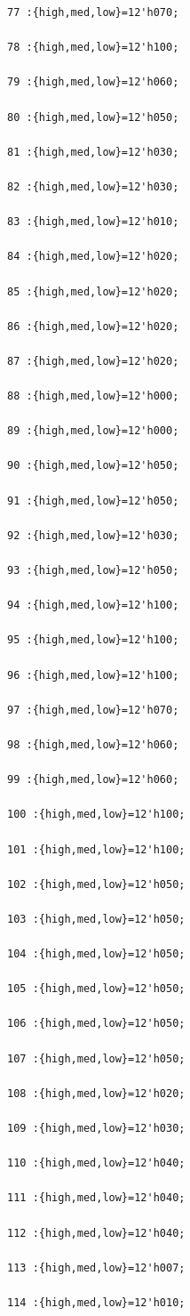 \documentclass[UTF8]{ctexart}
\begin{document}
\begin{verbatim}
77 :{high,med,low}=12'h070;

78 :{high,med,low}=12'h100;

79 :{high,med,low}=12'h060;

80 :{high,med,low}=12'h050;

81 :{high,med,low}=12'h030;

82 :{high,med,low}=12'h030;

83 :{high,med,low}=12'h010;

84 :{high,med,low}=12'h020;

85 :{high,med,low}=12'h020;

86 :{high,med,low}=12'h020;

87 :{high,med,low}=12'h020;

88 :{high,med,low}=12'h000;

89 :{high,med,low}=12'h000;

90 :{high,med,low}=12'h050;

91 :{high,med,low}=12'h050;

92 :{high,med,low}=12'h030;

93 :{high,med,low}=12'h050;

94 :{high,med,low}=12'h100;

95 :{high,med,low}=12'h100;

96 :{high,med,low}=12'h100;

97 :{high,med,low}=12'h070;

98 :{high,med,low}=12'h060;

99 :{high,med,low}=12'h060;

100 :{high,med,low}=12'h100;

101 :{high,med,low}=12'h100;

102 :{high,med,low}=12'h050;

103 :{high,med,low}=12'h050;

104 :{high,med,low}=12'h050;

105 :{high,med,low}=12'h050;

106 :{high,med,low}=12'h050;

107 :{high,med,low}=12'h050;

108 :{high,med,low}=12'h020;

109 :{high,med,low}=12'h030;

110 :{high,med,low}=12'h040;

111 :{high,med,low}=12'h040;

112 :{high,med,low}=12'h040;

113 :{high,med,low}=12'h007;

114 :{high,med,low}=12'h010;


\end{verbatim}
\end{document}
